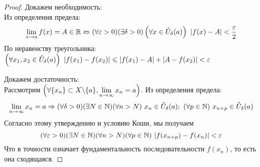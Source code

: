 \begin{proof}
	Докажем необходимость: \\
	Из определения предела:
	\[
		\liml_{x \ra a} f(x) = A \in \R \lra 
		(\forall \eps > 0)(\exists \delta > 0)
		\left(\forall x \in \mc{U}_{\delta}(a)\right)\ 
		|f(x) - A| < \frac{\eps}{2}
	\]
	По неравенству треугольника: $\left(\forall x_1, x_2
	\in \mathring{U}_{\delta}(a)\right)
	\ |f(x_1) - f(x_2)| \leqslant |f(x_1) - A| + |A - f(x_2)| < \varepsilon$
	
	Докажем достаточность: \\
	Рассмотрим $\left(\forall \{x_n\} \subset X \backslash \{a\},
	 \lim\limits_{n \to \infty} x_n = a\right)$. Из определения предела:
	$$
		\liml_{n \to \infty} x_n = a \Ra (\forall \delta > 0)
		(\exists N \in \N)(\forall n > N)\ 
		x_n \in \mc{U}_{\delta}(a);\ 
		(\forall p \in \N)\ x_{n + p} \in \mc{U}_{\delta} (a)
	$$
	Согласно этому утверждению и условию Коши, мы получаем
	$$
		(\forall \varepsilon > 0)(\exists N \in \mathbb{N})
		(\forall n > N)(\forall p \in \mathbb{N})\ |f(x_{n + p}) - f(x_n)| < \varepsilon
	$$
	Что в точности означает фундаментальность последовательности $f(x_n)$, то есть она сходящаяся.
\end{proof}